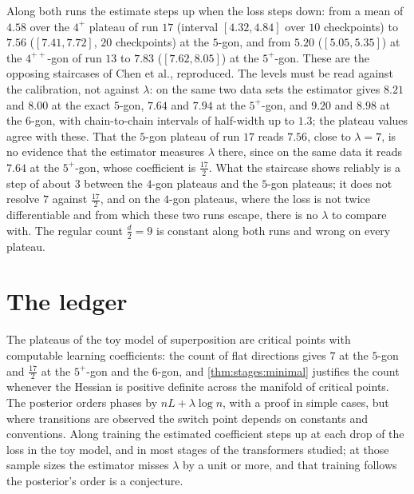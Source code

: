 \begin{refsection}
Along both runs the estimate steps up when the loss steps down: from a mean of $4.58$ over the $4^+$ plateau of run $17$ (interval $[4.32,4.84]$ over $10$ checkpoints) to $7.56$ ($[7.41,7.72]$, $20$ checkpoints) at the $5$-gon, and from $5.20$ ($[5.05,5.35]$) at the $4^{++}$-gon of run $13$ to $7.83$ ($[7.62,8.05]$) at the $5^+$-gon. These are the opposing staircases of Chen et al., reproduced. The levels must be read against the calibration, not against $\lambda$: on the same two data sets the estimator gives $8.21$ and $8.00$ at the exact $5$-gon, $7.64$ and $7.94$ at the $5^+$-gon, and $9.20$ and $8.98$ at the $6$-gon, with chain-to-chain intervals of half-width up to $1.3$; the plateau values agree with these. That the $5$-gon plateau of run $17$ reads $7.56$, close to $\lambda=7$, is no evidence that the estimator measures $\lambda$ there, since on the same data it reads $7.64$ at the $5^+$-gon, whose coefficient is $\frac{17}2$. What the staircase shows reliably is a step of about $3$ between the $4$-gon plateaus and the $5$-gon plateaus; it does not resolve $7$ against $\frac{17}2$, and on the $4$-gon plateaus, where the loss is not twice differentiable and from which these two runs escape, there is no $\lambda$ to compare with. The regular count $\frac d2=9$ is constant along both runs and wrong on every plateau.

\section{The ledger}\label{sec:stages:ledger}

The plateaus of the toy model of superposition are critical points with computable learning coefficients: the count of flat directions gives $7$ at the $5$-gon and $\frac{17}2$ at the $5^+$-gon and the $6$-gon, and \cref{thm:stages:minimal} justifies the count whenever the Hessian is positive definite across the manifold of critical points. The posterior orders phases by $nL+\lambda\log n$, with a proof in simple cases, but where transitions are observed the switch point depends on constants and conventions. Along training the estimated coefficient steps up at each drop of the loss in the toy model, and in most stages of the transformers studied; at those sample sizes the estimator misses $\lambda$ by a unit or more, and that training follows the posterior's order is a conjecture.


\end{refsection}
